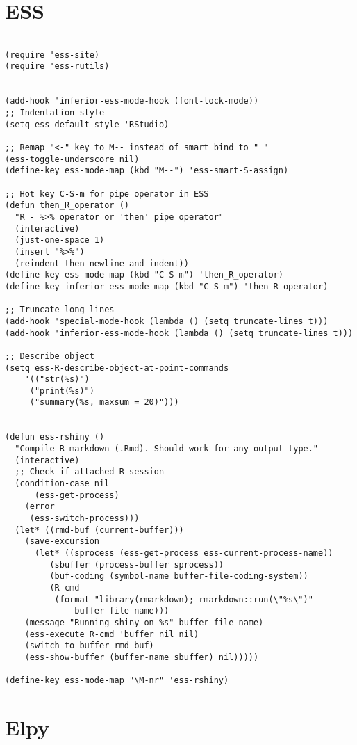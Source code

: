 \documentclass[11pt]{article}
\begin{document}
\section*{ESS}
\label{sec:org44f4a26}

\begin{verbatim}

(require 'ess-site)
(require 'ess-rutils)


(add-hook 'inferior-ess-mode-hook (font-lock-mode))
;; Indentation style
(setq ess-default-style 'RStudio)

;; Remap "<-" key to M-- instead of smart bind to "_"
(ess-toggle-underscore nil)
(define-key ess-mode-map (kbd "M--") 'ess-smart-S-assign)

;; Hot key C-S-m for pipe operator in ESS
(defun then_R_operator ()
  "R - %>% operator or 'then' pipe operator"
  (interactive)
  (just-one-space 1)
  (insert "%>%")
  (reindent-then-newline-and-indent))
(define-key ess-mode-map (kbd "C-S-m") 'then_R_operator)
(define-key inferior-ess-mode-map (kbd "C-S-m") 'then_R_operator)

;; Truncate long lines
(add-hook 'special-mode-hook (lambda () (setq truncate-lines t)))
(add-hook 'inferior-ess-mode-hook (lambda () (setq truncate-lines t)))

;; Describe object
(setq ess-R-describe-object-at-point-commands
    '(("str(%s)")
     ("print(%s)")
     ("summary(%s, maxsum = 20)")))


(defun ess-rshiny ()
  "Compile R markdown (.Rmd). Should work for any output type."
  (interactive)
  ;; Check if attached R-session
  (condition-case nil
      (ess-get-process)
    (error
     (ess-switch-process)))
  (let* ((rmd-buf (current-buffer)))
    (save-excursion
      (let* ((sprocess (ess-get-process ess-current-process-name))
	     (sbuffer (process-buffer sprocess))
	     (buf-coding (symbol-name buffer-file-coding-system))
	     (R-cmd
	      (format "library(rmarkdown); rmarkdown::run(\"%s\")"
		      buffer-file-name)))
	(message "Running shiny on %s" buffer-file-name)
	(ess-execute R-cmd 'buffer nil nil)
	(switch-to-buffer rmd-buf)
	(ess-show-buffer (buffer-name sbuffer) nil)))))

(define-key ess-mode-map "\M-nr" 'ess-rshiny)

\end{verbatim}

\section*{Elpy}
\label{sec:org1fd1df5}
\end{document}
